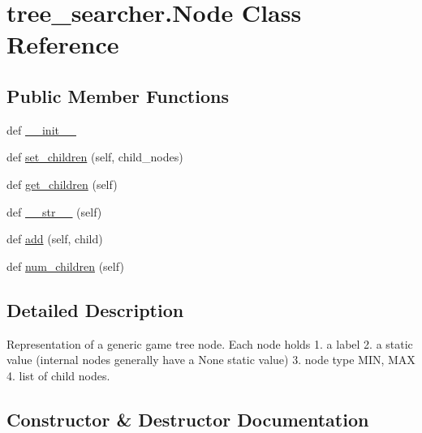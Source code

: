 \hypertarget{classtree__searcher_1_1_node}{}\section{tree\+\_\+searcher.\+Node Class Reference}
\label{classtree__searcher_1_1_node}
\subsection*{Public Member Functions}
\begin{DoxyCompactItemize}
\item 
def \hyperlink{classtree__searcher_1_1_node_a80ab00ecf5611a144eb7e24dd9a0b314}{\+\_\+\+\_\+init\+\_\+\+\_\+}
\item 
def \hyperlink{classtree__searcher_1_1_node_af3c56007d8740dba4d4a6445cc97f1c0}{set\+\_\+children} (self, child\+\_\+nodes)
\item 
def \hyperlink{classtree__searcher_1_1_node_a7108e576099089aafb9b935dfde86c2d}{get\+\_\+children} (self)
\item 
def \hyperlink{classtree__searcher_1_1_node_a9df64b2c256743926866b8174db61d6f}{\+\_\+\+\_\+str\+\_\+\+\_\+} (self)
\item 
def \hyperlink{classtree__searcher_1_1_node_a7613337237445f292443793ede8137e3}{add} (self, child)
\item 
def \hyperlink{classtree__searcher_1_1_node_a20a00b8d92aae1ffbb7c4ec70836777c}{num\+\_\+children} (self)
\end{DoxyCompactItemize}


\subsection{Detailed Description}
\begin{DoxyVerb}Representation of a generic game tree node.
Each node holds
1. a label
2. a static value (internal nodes
generally have a None static value)
3. node type  {MIN, MAX}
4. list of child nodes.
\end{DoxyVerb}
 

\subsection{Constructor \& Destructor Documentation}
\hypertarget{classtree__searcher_1_1_node_a80ab00ecf5611a144eb7e24dd9a0b314}{}
